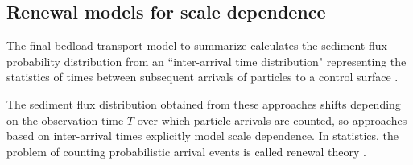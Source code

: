 \subsection{Renewal models for scale dependence}
\label{sec:renewal}
The final bedload transport model to summarize calculates the sediment flux probability distribution from an ``inter-arrival time distribution" representing the statistics of times between subsequent arrivals of particles to a control surface \citep{Turowski2010, Heyman2013,Ancey2020}.

The sediment flux distribution obtained from these approaches shifts depending on the observation time $T$ over which particle arrivals are counted, so approaches based on inter-arrival times explicitly model scale dependence.
In statistics, the problem of counting probabilistic arrival events is called renewal theory \citep{Cox1962}.

